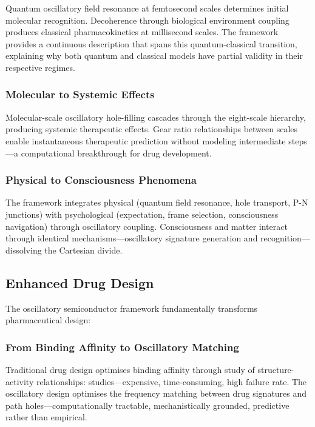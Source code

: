\documentclass{article}
\theoremstyle{definition}
\theoremstyle{remark}
\begin{document}
Quantum oscillatory field resonance at femtosecond scales determines initial molecular recognition. Decoherence through biological environment coupling produces classical pharmacokinetics at millisecond scales. The framework provides a continuous description that spans this quantum-classical transition, explaining why both quantum and classical models have partial validity in their respective regimes.

\subsubsection{Molecular to Systemic Effects}

Molecular-scale oscillatory hole-filling cascades through the eight-scale hierarchy, producing systemic therapeutic effects. Gear ratio relationships between scales enable instantaneous therapeutic prediction without modeling intermediate steps—a computational breakthrough for drug development.

\subsubsection{Physical to Consciousness Phenomena}

The framework integrates physical (quantum field resonance, hole transport, P-N junctions) with psychological (expectation, frame selection, consciousness navigation) through oscillatory coupling. Consciousness and matter interact through identical mechanisms—oscillatory signature generation and recognition—dissolving the Cartesian divide.

\subsection{Enhanced Drug Design}

The oscillatory semiconductor framework fundamentally transforms pharmaceutical design:

\subsubsection{From Binding Affinity to Oscillatory Matching}

Traditional drug design optimises binding affinity through study of structure-activity relationships: studies—expensive, time-consuming, high failure rate. The oscillatory design optimises the frequency matching between drug signatures and path holes—computationally tractable, mechanistically grounded, predictive rather than empirical.
\end{document}
